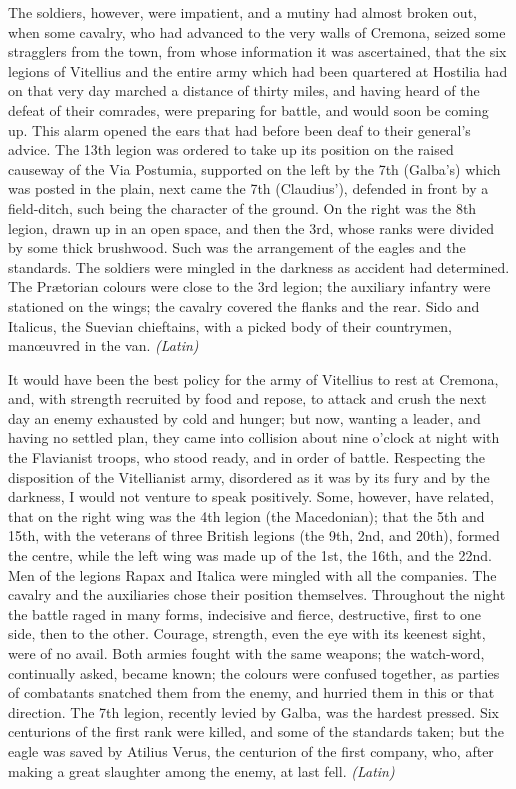The soldiers, however, were impatient, and a mutiny had almost broken out, when some cavalry, who had advanced to the very walls of Cremona, seized some stragglers from the town, from whose information it was ascertained, that the six legions of Vitellius and the entire army which had been quartered at Hostilia had on that very day marched a distance of thirty miles, and having heard of the defeat of their comrades, were preparing for battle, and would soon be coming up. This alarm opened the ears that had before been deaf to their general's advice. The 13th legion was ordered to take up its position on the raised causeway of the Via Postumia, supported on the left by the 7th (Galba's) which was posted in the plain, next came the 7th (Claudius'), defended in front by a field-ditch, such being the character of the ground. On the right was the 8th legion, drawn up in an open space, and then the 3rd, whose ranks were divided by some thick brushwood. Such was the arrangement of the eagles and the standards. The soldiers were mingled in the darkness as accident had determined. The Prætorian colours were close to the 3rd legion; the auxiliary infantry were stationed on the wings; the cavalry covered the flanks and the rear. Sido and Italicus, the Suevian chieftains, with a picked body of their countrymen, manœuvred in the van. \emph{(Latin)}


It would have been the best policy for the army of Vitellius to rest at Cremona, and, with strength recruited by food and repose, to attack and crush the next day an enemy exhausted by cold and hunger; but now, wanting a leader, and having no settled plan, they came into collision about nine o'clock at night with the Flavianist troops, who stood ready, and in order of battle. Respecting the disposition of the Vitellianist army, disordered as it was by its fury and by the darkness, I would not venture to speak positively. Some, however, have related, that on the right wing was the 4th legion (the Macedonian); that the 5th and 15th, with the veterans of three British legions (the 9th, 2nd, and 20th), formed the centre, while the left wing was made up of the 1st, the 16th, and the 22nd. Men of the legions Rapax and Italica were mingled with all the companies. The cavalry and the auxiliaries chose their position themselves. Throughout the night the battle raged in many forms, indecisive and fierce, destructive, first to one side, then to the other. Courage, strength, even the eye with its keenest sight, were of no avail. Both armies fought with the same weapons; the watch-word, continually asked, became known; the colours were confused together, as parties of combatants snatched them from the enemy, and hurried them in this or that direction. The 7th legion, recently levied by Galba, was the hardest pressed. Six centurions of the first rank were killed, and some of the standards taken; but the eagle was saved by Atilius Verus, the centurion of the first company, who, after making a great slaughter among the enemy, at last fell. \emph{(Latin)}


